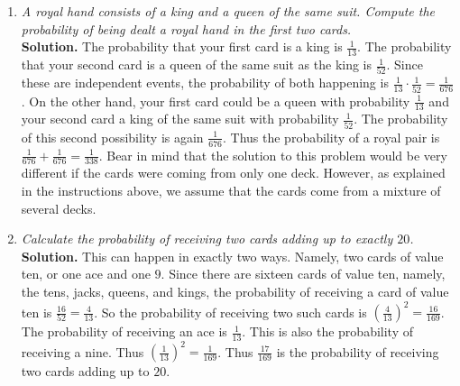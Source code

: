 \documentclass[12pt]{article}
\begin{document}
\begin{enumerate}
\item{\em A {\em royal hand} consists of a king and a queen
of the same suit. Compute the probability of being
dealt a royal hand in the first two cards.}\\
{\bf Solution.} The probability that your first card
is a king is $\frac{1}{13}$.
The probability that your second card is a queen of the same
suit as the king is $\frac{1}{52}$. Since these are independent events,
the probability of both happening is
$\frac{1}{13}\cdot\frac{1}{52}=\frac{1}{676}$.
On the other hand, your first card could be a queen with probability
$\frac{1}{13}$ and your second card a king of the same suit
with probability $\frac{1}{52}$.
The probability of this second possibility is again $\frac{1}{676}$.
Thus the probability of a royal pair is
$\frac{1}{676}+\frac{1}{676}=\frac{1}{338}$.
Bear in mind that the solution to this problem would be very
different if the cards were coming from only one deck. However,
as explained in the instructions above, we assume that the cards
come from a mixture of several decks.

\item{\em Calculate the probability of receiving two
cards adding up to exactly $20$.}\\
{\bf Solution.} This can happen in exactly two ways. Namely,
two cards of value ten, or one ace and one $9$.
Since there are sixteen cards of value ten, namely,
the tens, jacks, queens, and kings, the probability of receiving
a card of value ten is $\frac{16}{52}=\frac{4}{13}$.
So the probability of receiving two such cards is
$\left(\frac{4}{13}\right)^2=\frac{16}{169}$.
The probability of receiving an ace is $\frac{1}{13}$.
This is also the probability of receiving a nine.
Thus $\left(\frac{1}{13}\right)^2=\frac{1}{169}$.
Thus $\frac{17}{169}$ is the probability of receiving two
cards adding up to $20$.

\end{enumerate}
\end{document}
